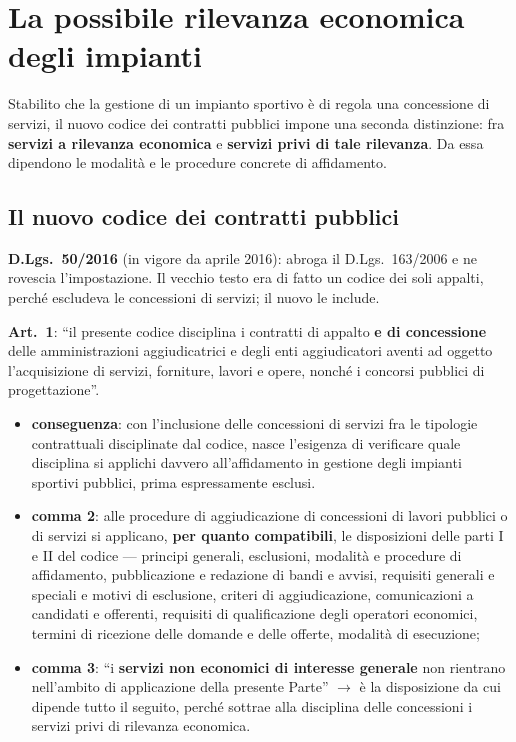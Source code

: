 \chapter{La possibile rilevanza economica degli impianti}

Stabilito che la gestione di un impianto sportivo è di regola una concessione di servizi, il nuovo
codice dei contratti pubblici impone una seconda distinzione: fra \textbf{servizi a rilevanza
economica} e \textbf{servizi privi di tale rilevanza}. Da essa dipendono le modalità e le
procedure concrete di affidamento.

\section{Il nuovo codice dei contratti pubblici}

\textbf{D.Lgs.\ 50/2016} (in vigore da aprile 2016): abroga il D.Lgs.\ 163/2006 e ne rovescia
l'impostazione. Il vecchio testo era di fatto un codice dei soli appalti, perché escludeva le
concessioni di servizi; il nuovo le include.

\textbf{Art.\ 1}: ``il presente codice disciplina i contratti di appalto \textbf{e di concessione}
delle amministrazioni aggiudicatrici e degli enti aggiudicatori aventi ad oggetto l'acquisizione di
servizi, forniture, lavori e opere, nonché i concorsi pubblici di progettazione''.

\begin{itemize}
  \item \textbf{conseguenza}: con l'inclusione delle concessioni di servizi fra le tipologie
    contrattuali disciplinate dal codice, nasce l'esigenza di verificare quale disciplina si
    applichi davvero all'affidamento in gestione degli impianti sportivi pubblici, prima
    espressamente esclusi.
\end{itemize}


\begin{itemize}
  \item \textbf{comma 2}: alle procedure di aggiudicazione di concessioni di lavori pubblici o di
    servizi si applicano, \textbf{per quanto compatibili}, le disposizioni delle parti I e II del
    codice --- principi generali, esclusioni, modalità e procedure di affidamento, pubblicazione e
    redazione di bandi e avvisi, requisiti generali e speciali e motivi di esclusione, criteri di
    aggiudicazione, comunicazioni a candidati e offerenti, requisiti di qualificazione degli
    operatori economici, termini di ricezione delle domande e delle offerte, modalità di
    esecuzione;
  \item \textbf{comma 3}: ``i \textbf{servizi non economici di interesse generale} non rientrano
    nell'ambito di applicazione della presente Parte'' $\rightarrow$ è la disposizione da cui
    dipende tutto il seguito, perché sottrae alla disciplina delle concessioni i servizi privi di
    rilevanza economica.
\end{itemize}

